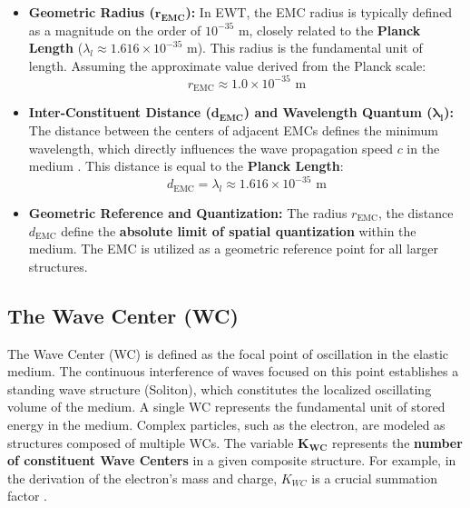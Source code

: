 \documentclass[10pt,a4paper]{article}
\begin{document}
\begin{itemize}
	\item \textbf{Geometric Radius ($\mathbf{r_{\text{EMC}}}$):} In EWT, the EMC radius is typically defined as a magnitude on the order of $10^{-35} \text{ m}$, closely related to the \textbf{Planck Length} ($\lambda_{l} \approx 1.616 \times 10^{-35} \text{ m}$). This radius is the fundamental unit of length. Assuming the approximate value derived from the Planck scale:
	\begin{equation}
		r_{\text{EMC}} \approx 1.0 \times 10^{-35} \text{ m}
		\label{eq:granule_radius_approx}
	\end{equation}
	
	\item \textbf{Inter-Constituent Distance ($\mathbf{d_{\text{EMC}}}$) and Wavelength Quantum ($\mathbf{\lambda_{l}}$):} The distance between the centers of adjacent EMCs defines the minimum wavelength, which directly influences the wave propagation speed $c$ in the medium \cite{Yee2020Aether}. This distance is equal to the \textbf{Planck Length}:
	\begin{equation}
		d_{\text{EMC}} = \lambda_{l} \approx 1.616 \times 10^{-35} \text{ m}
		\label{eq:emc_distance}
	\end{equation}
	
	\item \textbf{Geometric Reference and Quantization:} The radius $r_{\text{EMC}}$, the distance $d_{\text{EMC}}$ %
	define the \textbf{absolute limit of spatial quantization} within the medium. The EMC is utilized as a geometric reference point for all larger structures.
\end{itemize}

\subsection{The Wave Center (WC)}

The Wave Center (WC) is defined as the focal point of oscillation in the elastic medium. The continuous interference of waves focused on this point establishes a standing wave structure (Soliton), which constitutes the localized oscillating volume of the medium. A single WC represents the fundamental unit of stored energy in the medium. Complex particles, such as the electron, are modeled as structures composed of multiple WCs. The variable $\mathbf{K_{WC}}$ represents the \textbf{number of constituent Wave Centers} in a given composite structure. For example, in the derivation of the electron's mass and charge, $K_{WC}$ is a crucial summation factor \cite{yee2019geometry}.
\end{document}
